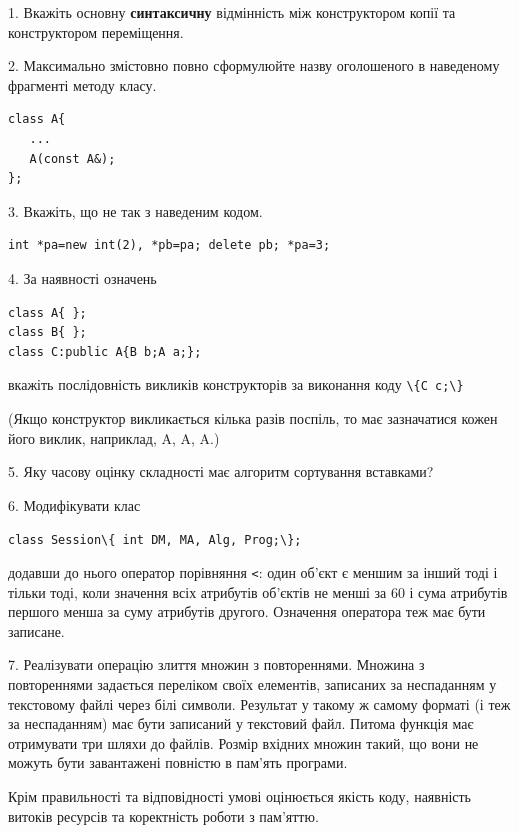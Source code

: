 \documentclass[12pt, ukrainian]{article}
\def\code#1{\Verb!#1!}
\begin{document}
{%
1. Вкажіть основну \textbf{синтаксичну} відмінність між конструктором копії та конструктором переміщення.%
\par
\vspace{2mm}
2. Максимально змістовно повно сформулюйте назву оголошеного в наведеному фрагменті методу класу.
\vspace{-3mm}
\begin{verbatim}class A{
   ...
   A(const A&);
};\end{verbatim}
\vspace{-3mm}
\par
\vspace{2mm}
3. Вкажіть, що не так з наведеним кодом.
\vspace{-3mm}
\begin{verbatim}int *pa=new int(2), *pb=pa; delete pb; *pa=3;\end{verbatim}
\vspace{-3mm}
\par
\vspace{2mm}
4. За наявності означень
\vspace{-3mm}
\begin{verbatim}
class A{ };
class B{ };
class C:public A{B b;A a;};\end{verbatim}
\vspace{-3mm}
вкажіть послідовність викликів конструкторів за виконання коду \code{\{C c;\}} 

(Якщо конструктор викликається кілька разів поспіль, то має зазначатися кожен його виклик, наприклад, A, A, A.)

\vspace{2mm}
5. Яку часову оцінку складності має алгоритм сортування вставками?
\par
\vspace{2mm}
6. Модифікувати клас 

\qquad\code{class Session\{ int DM, MA, Alg, Prog;\};} 


додавши до нього оператор порівняння \code{<}: один об'єкт є меншим за інший тоді і тільки тоді, коли значення всіх атрибутів об'єктів не менші за 60 і сума атрибутів першого менша за суму атрибутів другого. Означення оператора теж має бути записане.%
\par
\vspace{2mm}
7. 
Реалізувати операцію злиття множин з повтореннями. Множина з повтореннями задається переліком своїх елементів, записаних за неспаданням у текстовому файлі через білі символи. Результат у такому ж самому форматі (і теж за неспаданням) має бути записаний у текстовий файл. Питома функція має отримувати три шляхи до файлів. Розмір вхідних множин такий, що вони не можуть бути завантажені повністю в пам’ять програми.

Крім правильності та відповідності умові оцінюється якість коду, наявність витоків ресурсів та коректність роботи з пам'яттю. 

}
\end{document}
